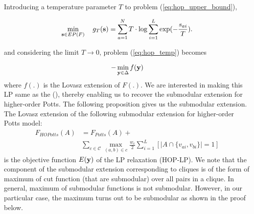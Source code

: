 Introducing a temperature parameter $T$ to problem (\ref{eq:hop_upper_bound}), 

\begin{equation}
    \min_{{\bf s} \in EP(F)} \quad g_T ({\bf s}) = \sum_{a = 1}^{N} T \cdot \log \sum_{i = 1}^L \exp(-\frac{s_{ai}}{T}).
\label{eq:hop_temp}
\end{equation}

and considering the limit $T \to 0$, problem (\ref{eq:hop_temp}) becomes

\begin{align}
    - \min_{{\bf y} \in \Delta} f({\bf y}) 
\end{align}
where $f(.)$ is the Lovasz extension of $F(.)$. We are interested in making
this LP same as the (), thereby enabling us to recover the submodular extension
for higher-order Potts. The following proposition gives us the submodular
extension.
{\proposition The Lovasz extension of the following submodular extension for
  higher-order Potts model:
  \begin{align}
      F_{HOPotts}(A) &= F_{Potts}(A) + \nonumber \\
        &\sum_{c \in {\mathcal C}} \max_{(a, b) \in c} \frac{w_c}{2} \sum_{i = 1}^L [|A \cap \{v_{ai}, v_{bi}\}| = 1]
\end{align}
is the objective function $E({\bf y})$ of the LP relaxation (HOP-LP).
\label{proposition:hop_extension}}
\newline
We note that the component of the submodular extension corresponding to cliques is of the form of maximum of cut function (that are submodular) over all pairs in a clique. In general, maximum of submodular functions is not submodular. However, in our particular case, the maximum turns out to be submodular as shown in the proof below. 

